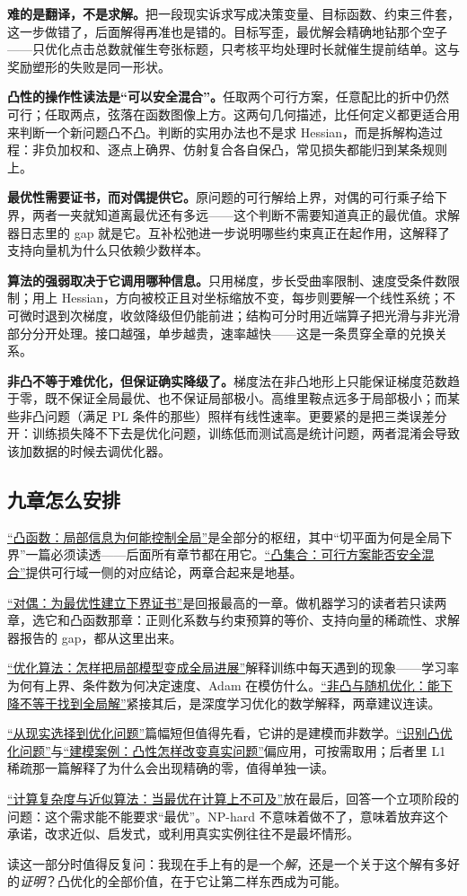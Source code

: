 \textbf{难的是翻译，不是求解。}把一段现实诉求写成决策变量、目标函数、约束三件套，这一步做错了，后面解得再准也是错的。目标写歪，最优解会精确地钻那个空子——只优化点击总数就催生夸张标题，只考核平均处理时长就催生提前结单。这与奖励塑形的失败是同一形状。

\textbf{凸性的操作性读法是``可以安全混合''。}任取两个可行方案，任意配比的折中仍然可行；任取两点，弦落在函数图像上方。这两句几何描述，比任何定义都更适合用来判断一个新问题凸不凸。判断的实用办法也不是求 Hessian，而是拆解构造过程：非负加权和、逐点上确界、仿射复合各自保凸，常见损失都能归到某条规则上。

\textbf{最优性需要证书，而对偶提供它。}原问题的可行解给上界，对偶的可行乘子给下界，两者一夹就知道离最优还有多远——这个判断不需要知道真正的最优值。求解器日志里的 gap 就是它。互补松弛进一步说明哪些约束真正在起作用，这解释了支持向量机为什么只依赖少数样本。

\textbf{算法的强弱取决于它调用哪种信息。}只用梯度，步长受曲率限制、速度受条件数限制；用上 Hessian，方向被校正且对坐标缩放不变，每步则要解一个线性系统；不可微时退到次梯度，收敛降级但仍能前进；结构可分时用近端算子把光滑与非光滑部分分开处理。接口越强，单步越贵，速率越快——这是一条贯穿全章的兑换关系。

\textbf{非凸不等于难优化，但保证确实降级了。}梯度法在非凸地形上只能保证梯度范数趋于零，既不保证全局最优、也不保证局部极小。高维里鞍点远多于局部极小；而某些非凸问题（满足 PL 条件的那些）照样有线性速率。更要紧的是把三类误差分开：训练损失降不下去是优化问题，训练低而测试高是统计问题，两者混淆会导致该加数据的时候去调优化器。

\subsection{九章怎么安排}

\hyperref[ch:073]{``凸函数：局部信息为何能控制全局''}是全部分的枢纽，其中``切平面为何是全局下界''一篇必须读透——后面所有章节都在用它。\hyperref[ch:072]{``凸集合：可行方案能否安全混合''}提供可行域一侧的对应结论，两章合起来是地基。

\hyperref[ch:075]{``对偶：为最优性建立下界证书''}是回报最高的一章。做机器学习的读者若只读两章，选它和凸函数那章：正则化系数与约束预算的等价、支持向量的稀疏性、求解器报告的 gap，都从这里出来。

\hyperref[ch:076]{``优化算法：怎样把局部模型变成全局进展''}解释训练中每天遇到的现象——学习率为何有上界、条件数为何决定速度、Adam 在模仿什么。\hyperref[ch:078]{``非凸与随机优化：能下降不等于找到全局解''}紧接其后，是深度学习优化的数学解释，两章建议连读。

\hyperref[ch:071]{``从现实选择到优化问题''}篇幅短但值得先看，它讲的是建模而非数学。\hyperref[ch:074]{``识别凸优化问题''}与\hyperref[ch:077]{``建模案例：凸性怎样改变真实问题''}偏应用，可按需取用；后者里 L1 稀疏那一篇解释了为什么会出现精确的零，值得单独一读。

\hyperref[ch:079]{``计算复杂度与近似算法：当最优在计算上不可及''}放在最后，回答一个立项阶段的问题：这个需求能不能要求``最优''。NP-hard 不意味着做不了，意味着放弃这个承诺，改求近似、启发式，或利用真实实例往往不是最坏情形。

读这一部分时值得反复问：我现在手上有的是一个\emph{解}，还是一个关于这个解有多好的\emph{证明}？凸优化的全部价值，在于它让第二样东西成为可能。
